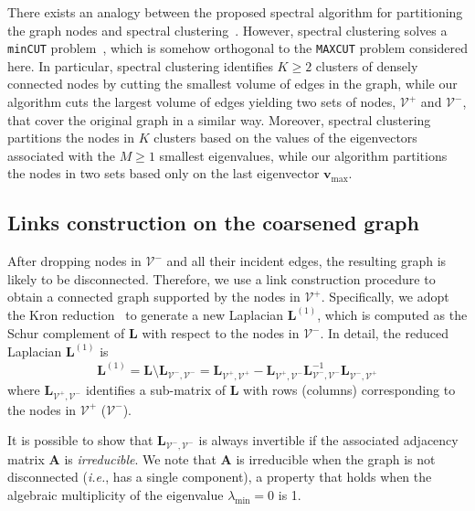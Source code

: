 \documentclass[journal]{IEEEtran}
\def\v{{\mathbf v}}
\def\A{{\mathbf A}}
\def\L{{\mathbf L}}
\newcommand{\maxcut}{\texttt{\small{MAXCUT}}}
\begin{document}
There exists an analogy between the proposed spectral algorithm for partitioning the graph nodes and spectral clustering~\cite{von2007tutorial}.
However, spectral clustering solves a \texttt{\small{minCUT}} problem~\cite{shi2000normalized, icml2020_1614}, which is somehow orthogonal to the \maxcut{} problem considered here.
In particular, spectral clustering identifies $K \geq 2$ clusters of densely connected nodes by cutting the smallest volume of edges in the graph, while our algorithm cuts the largest volume of edges yielding two sets of nodes, $\mathcal{V}^{+}$ and $\mathcal{V}^{-}$, that cover the original graph in a similar way.
Moreover, spectral clustering partitions the nodes in $K$ clusters based on the values of the eigenvectors associated with the $M \geq 1$ smallest eigenvalues, while our algorithm partitions the nodes in two sets based only on the last eigenvector $\v_\text{max}$.

\subsection{Links construction on the coarsened graph}
\label{sec:links_construction}
After dropping nodes in $\mathcal{V}^{-}$ and all their incident edges, the resulting graph is likely to be disconnected.
Therefore, we use a link construction procedure to obtain a connected graph supported by the nodes in $\mathcal{V}^{+}$.
Specifically, we adopt the Kron reduction~\cite{kron_red} to generate a new Laplacian $\L^{(1)}$, which is computed as the Schur complement of $\L$ with respect to the nodes in $\mathcal{V}^{-}$.
In detail, the reduced Laplacian $\L^{(1)}$ is
\begin{equation}
\label{eq:kron}
\L^{(1)} = \L \setminus \L_{\mathcal{V}^{-}, \mathcal{V}^{-}} = \L_{\mathcal{V}^{+}, \mathcal{V}^{+}} - \L_{\mathcal{V}^{+}, \mathcal{V}^{-}} \L_{\mathcal{V}^{-}, \mathcal{V}^{-}}^{-1} \L_{\mathcal{V}^{-}, \mathcal{V}^{+}}
\end{equation}
where $\L_{\mathcal{V}^{+}, \mathcal{V}^{-}}$ identifies a sub-matrix of $\L$ with rows (columns) corresponding to the nodes in $\mathcal{V}^{+}$ ($\mathcal{V}^{-}$).

It is possible to show that $\L_{\mathcal{V}^{-}, \mathcal{V}^{-}}$ is always invertible if the associated adjacency matrix $\A$ is \textit{irreducible}.
We note that $\A$ is irreducible when the graph is not disconnected (\textit{i.e.}, has a single component), a property that holds when the algebraic multiplicity of the eigenvalue $\lambda_\text{min}=0$ is 1.
\end{document}

